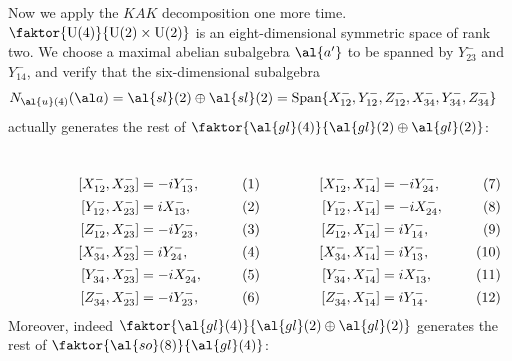 Now we apply the $KAK$ decomposition one more time. $\faktor{\gr{U}{4}}{\gr{U}{2} \times \gr{U}{2}}$ is an eight-dimensional symmetric space of rank two. We choose a maximal abelian subalgebra $\al{a'}$ to be spanned by $Y^-_{23}$ and $Y^-_{14}$, and verify that the six-dimensional subalgebra
\begin{align}
	N_{\al{u}(4)}(\al a) &= \al{sl}(2) \oplus \al{sl}(2) = \text{Span}\{ X^-_{12},Y^-_{12},Z^-_{12},X^-_{34},Y^-_{34},Z^-_{34} \}
\end{align}
actually generates the rest of $\faktor{\al{gl}(4)}{\al{gl}(2) \oplus \al{gl}(2)}$:
\begin{equation*}
	\noindent\begin{minipage}[t]{.5\textwidth}
		\begin{align}
			[X^-_{12},X^-_{23}] &= -iY^-_{13}, \\
			[Y^-_{12},X^-_{23}] &=  iX^-_{13}, \\
			[Z^-_{12},X^-_{23}] &= -iY^-_{23}, \\
			[X^-_{34},X^-_{23}] &=  iY^-_{24}, \\
			[Y^-_{34},X^-_{23}] &= -iX^-_{24}, \\
			[Z^-_{34},X^-_{23}] &= -iY^-_{23},
		\end{align}
	\end{minipage}
	\begin{minipage}[t]{.5\textwidth}
		\begin{align}
			[X^-_{12},X^-_{14}] &= -iY^-_{24}, \\
			[Y^-_{12},X^-_{14}] &= -iX^-_{24}, \\
			[Z^-_{12},X^-_{14}] &=  iY^-_{14}, \\
			[X^-_{34},X^-_{14}] &=  iY^-_{13}, \\
			[Y^-_{34},X^-_{14}] &=  iX^-_{13}, \\
			[Z^-_{34},X^-_{14}] &=  iY^-_{14}.
		\end{align}
	\end{minipage} \nonumber
\end{equation*}
Moreover, indeed $\faktor{\al{gl}(4)}{\al{gl}(2) \oplus \al{gl}(2)}$ generates the rest of $\faktor{\al{so}(8)}{\al{gl}(4)}$:
